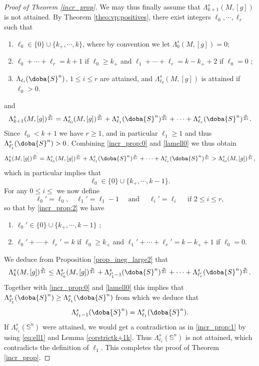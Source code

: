 \documentclass[10pt]{amsart}
\numberwithin{equation}{section}
\def\La{{\Lambda}}
\gdef\mS{\doba{S}}
\theoremstyle{plain}
\theoremstyle{remark}
\begin{document}
\begin{proof} [Proof of Theorem \ref{incr_prop}]
We may thus finally assume that $\Lambda_{k+1}^s(M,[g])$ is not attained. By Theorem \ref{theo:vp:positives}, there exist integers $\ell_0, \cdots,\ell_r$ such that 
\begin{enumerate}
\item  $\ell_0 \in \{ 0 \} \cup \{ k_+  ,\cdots, k \}$, where by convention we let $\Lambda_0^s(M,[g])= 0$;
 \item $\ell_0  + \cdots + \ell_r =k+1$ if $\ell_0 \geq k_+ $ and $\ell_1+ \cdots + \ell_r= k-k_+ +2$ if $\ell_0 =0$ ; 
 \item $\La_{\ell_i}(\mS^n)$, $1 \le i \le r$ are attained, and $\La_{\ell_0}^s(M,[g])$ is attained if $\ell_0 >0$.   
 \end{enumerate} 
 and 
\begin{equation} \label{lamell0}
 \Lambda^s_{k+1}(M,[g])^{\frac{n}{2s}}= \La_{\ell_0}^s(M,[g])^{\frac{n}{2s}} + \La_{\ell_1}^s(\mS^n)^{\frac{n}{2s}} +  \cdots + 
 \La_{\ell_r}^s(\mS^n)^{\frac{n}{2s}} .\end{equation}
Since $\ell_0 < k+1$ we have $r\geq 1$, and in particular $\ell_1 \geq 1$ and thus $\La_{\ell_1'}^s(\mS^n) >0$. Combining \eqref{incr_prop:0} and \eqref{lamell0} we thus obtain 
$$ \Lambda_k^s(M,[g])^{\frac{n}{2s}} =   \La_{\ell_0}^s(M,[g])^{\frac{n}{2s}} + \La_{\ell_1}^s(\mS^n)^{\frac{n}{2s}} +  \cdots + 
 \La_{\ell_r}^s(\mS^n)^{\frac{n}{2s}} > \La_{\ell_0}^s(M,[g])^{\frac{n}{2s}}, $$
 which in particular implies that 
 \begin{equation} \label{incr_prop:2}
\ell_0 \in \{ 0 \} \cup \{ k_+  ,\cdots, k -1\}.
\end{equation}
For any $0 \le i \le $ we now define 
$$\ell_0' = \ell_0, \quad \ell_1'=\ell_1-1 \quad \text{ and } \quad \ell_i'=\ell_i \quad \text{ if } 2 \le i \le r, $$ 
so that by \eqref{incr_prop:2} we have 
\begin{enumerate}
\item  $\ell_0' \in \{ 0 \} \cup \{ k_+  ,\cdots, k-1 \}$ ;
 \item $\ell_0'  + \cdots + \ell_r' =k$ if $\ell_0 \geq k_+ $ and $\ell_1'+ \cdots + \ell_r'= k-k_+ +1$ if $\ell_0 =0$. 
 \end{enumerate} 
 We deduce from Proposition \ref{prop_ineg_large2} that 
$$\Lambda^s_{k}(M,[g])^{\frac{n}{2s}} 
 \leq  \La_{\ell_0'}^s(M,[g])^{\frac{n}{2s}} + \La_{\ell_1'-1}^s(\mS^n)^{\frac{n}{2s}} +  \cdots + 
 \La_{\ell_r'}^s(\mS^n)^{\frac{n}{2s}}.$$
 Together with \eqref{incr_prop:0} and \eqref{lamell0} this implies that $\La_{\ell_1'}^s(\mS^n) \geq \La_{\ell_1}^s(\mS^n)$ from which we deduce that
\begin{equation} \label{eq:ell1} \La_{\ell_1 - 1}^s(\mS^n) = \La_{\ell_1}^s(\mS^n). \end{equation}
If $\Lambda_{\ell_1}^s(\mathbb{S}^n)$ were attained, we would get a contradiction as in \eqref{incr_prop:1}  by using \eqref{eq:ell1} and Lemma \ref{corstrictk+1k}. Thus $\Lambda_{\ell_1}^s(\mathbb{S}^n)$ is not attained, which contradicts the definition of $\ell_1$. This completes the proof of Theorem \ref{incr_prop}.
\end{proof}
\end{document}
